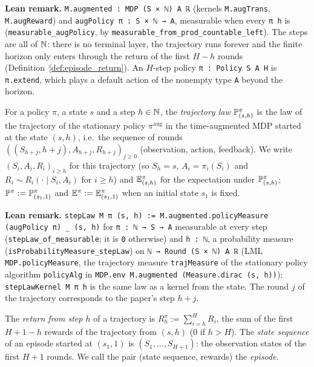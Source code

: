 \textbf{Lean remark.} \texttt{M.augmented : MDP (S × ℕ) A ℝ} (kernels \texttt{M.augTrans},
\texttt{M.augReward}) and \texttt{augPolicy π : S × ℕ → A}, measurable when every
\texttt{π h} is (\texttt{measurable\_augPolicy}, by
\texttt{measurable\_from\_prod\_countable\_left}). The steps are all of $\mathbb{N}$: there is no
terminal layer, the trajectory runs forever and the finite horizon only enters through the
return of the first $H - h$ rounds (Definition~\ref{def:episode_return}). An $H$-step policy
\texttt{π : Policy S A H} is \texttt{π.extend}, which plays a default action of the nonempty
type \texttt{A} beyond the horizon.

\begin{definition}\label{def:step_law}
\leanok
{}
For a policy $\pi$, a state $s$ and a step $h \in \mathbb{N}$, the \emph{trajectory law}
$\mathbb{P}^\pi_{(s, h)}$ is the law of the trajectory of the stationary policy $\pi^{\mathrm{aug}}$ in
the time-augmented MDP started at the state $(s, h)$, i.e.\ the sequence of rounds
$((S_{h+j}, h + j), A_{h+j}, R_{h+j})_{j \ge 0}$ (observation, action, feedback). We write
$(S_i, A_i, R_i)_{i \ge h}$ for this trajectory (so $S_h = s$, $A_i = \pi_i(S_i)$ and
$R_i \sim R_i(\cdot \mid S_i, A_i)$ for $i \ge h$) and $\mathbb{E}^\pi_{(s, h)}$ for the expectation under
$\mathbb{P}^\pi_{(s, h)}$; $\mathbb{P}^\pi := \mathbb{P}^\pi_{(s_1, 1)}$ and $\mathbb{E}^\pi := \mathbb{E}^\pi_{(s_1, 1)}$ when an
initial state $s_1$ is fixed.
\end{definition}

\textbf{Lean remark.} \texttt{stepLaw M π (s, h) := M.augmented.policyMeasure (augPolicy π) \_ (s, h)}
for \texttt{π : ℕ → S → A} measurable at every step (\texttt{stepLaw\_of\_measurable}; it is
\texttt{0} otherwise) and \texttt{h : ℕ}, a probability measure
(\texttt{isProbabilityMeasure\_stepLaw}) on
\texttt{ℕ → Round (S × ℕ) A ℝ} (LML \texttt{MDP.policyMeasure}, the trajectory measure
\texttt{trajMeasure} of the stationary policy algorithm \texttt{policyAlg} in
\texttt{MDP.env M.augmented (Measure.dirac (s, h))}); \texttt{stepLawKernel M π h} is the same
law as a kernel from the state. The round $j$ of the trajectory corresponds to the paper's step
$h + j$.

\begin{definition}\label{def:episode_return}
\leanok
{}
The \emph{return from step $h$} of a trajectory is $R^\pi_h := \sum_{i = h}^H R_i$, the sum of
the first $H + 1 - h$ rewards of the trajectory from $(s, h)$ ($0$ if $h > H$). The
\emph{state sequence} of an episode started at $(s_1, 1)$ is $(S_1, \dots, S_{H+1})$: the
observation states of the first $H + 1$ rounds. We call the pair (state sequence, rewards) the
\emph{episode}.
\end{definition}

